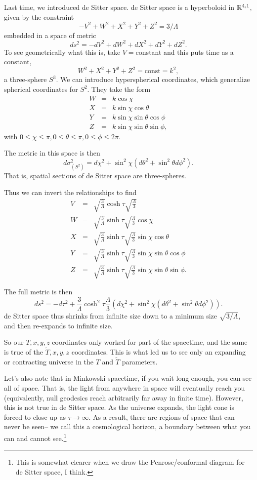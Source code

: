 Last time, we introduced de Sitter space. de Sitter space is a hyperboloid in $\mathbb{R}^{4,1}$, given by the constraint
$$-V^2+W^2+X^2+Y^2+Z^2=3/\Lambda$$
embedded in a space of metric
$$ds^2=-dV^2+dW^2+dX^2+dY^2+dZ^2.$$
To see geometrically what this is, take $V=$constant and this puts time as a constant,
$$W^2+X^2+Y^2+Z^2=\text{const}=k^2,$$ a three-sphere $S^3$. We can introduce hyperspherical coordinates, which generalize spherical coordinates for $S^2$. They take the form
\begin{eqnarray*}
W&=&k\cos\chi\\
X&=&k\sin\chi \cos\theta\\
Y&=&k\sin\chi\sin\theta \cos\phi\\
Z&=&k\sin\chi\sin\theta\sin\phi,
\end{eqnarray*}
with $0\leq \chi \leq \pi, 0\leq \theta\leq \pi, 0\leq \phi \leq 2\pi.$

The metric in this space is then
$$d\sigma^2_{(S^2)}=d\chi^2 + \sin^2\chi (d\theta^2+\sin^2\theta d\phi^2).$$
That is, spatial sections of de Sitter space are three-spheres.

Thus we can invert the relationships to find
\begin{eqnarray*}
V&=&\sqrt{\frac{3}{\Lambda}}\cosh\tau \sqrt{\frac{\Lambda}{3}}\\
W&=&\sqrt{\frac{3}{\Lambda}}\sinh\tau \sqrt{\frac{\Lambda}{3}}\cos\chi\\
X&=&\sqrt{\frac{3}{\Lambda}}\sinh\tau \sqrt{\frac{\Lambda}{3}}\sin\chi\cos\theta\\
Y&=&\sqrt{\frac{3}{\Lambda}}\sinh\tau \sqrt{\frac{\Lambda}{3}}\sin\chi\sin\theta\cos\phi\\
Z&=&\sqrt{\frac{3}{\Lambda}}\sinh\tau \sqrt{\frac{\Lambda}{3}}\sin\chi\sin\theta\sin\phi.
\end{eqnarray*}

The full metric is then
$$ds^2=-d\tau^2+\frac{3}{\Lambda}\cosh^2\tau \frac{\Lambda}{3}\left(d\chi^2 + \sin^2\chi (d\theta^2+\sin^2\theta d\phi^2)\right).$$
de Sitter space thus shrinks from infinite size down to a minimum size $\sqrt{3/\Lambda}$, and then re-expands to infinite size.

So our $T,x,y,z$ coordinates only worked for part of the spacetime, and the same is true of the $\tilde T,x,y,z$ coordinates. This is what led us to see only an expanding or contracting universe in the $T$ and $\tilde T$ parameters.

Let's also note that in Minkowski spacetime, if you wait long enough, you can see all of space. That is, the light from anywhere in space will eventually reach you (equivalently, null geodesics reach arbitrarily far away in finite time). However, this is not true in de Sitter space. As the universe expands, the light cone is forced to close up as $\tau\to \infty$. As a result, there are regions of space that can never be seen-- we call this a cosmological horizon, a boundary between what you can and cannot see.\footnote{This is somewhat clearer when we draw the Penrose/conformal diagram for de Sitter space, I think.}

